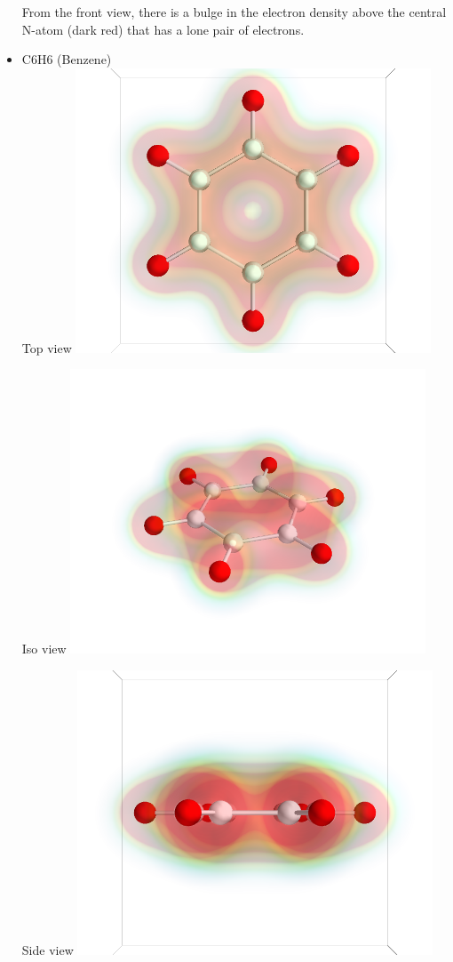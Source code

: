 \documentclass[11pt]{article}
\begin{document}
\begin{itemize}
From the front view, there is a bulge in the electron density above the central N-atom (dark red) that has a lone pair of electrons.


\item C6H6 (Benzene)\\
\label{sec-1-6-1-5}%
Top view
\includegraphics[width=.9\linewidth]{./images/C6H6_top.png}

Iso view
\includegraphics[width=.9\linewidth]{./images/C6H6_iso.png}

Side view
\includegraphics[width=.9\linewidth]{./images/C6H6_side.png}


\end{itemize}
\end{document}
